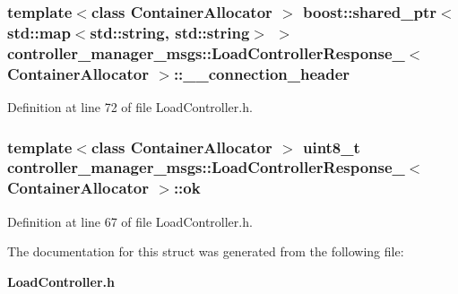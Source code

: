 \subsubsection[{\-\_\-\-\_\-connection\-\_\-header}]{\setlength{\rightskip}{0pt plus 5cm}template$<$class Container\-Allocator $>$ boost\-::shared\-\_\-ptr$<$std\-::map$<$std\-::string, std\-::string$>$ $>$ {\bf controller\-\_\-manager\-\_\-msgs\-::\-Load\-Controller\-Response\-\_\-}$<$ \-Container\-Allocator $>$\-::{\bf \-\_\-\-\_\-connection\-\_\-header}}\label{structcontroller__manager__msgs_1_1LoadControllerResponse___ad07fce554b682ac2e528c9405b0061b2}


\-Definition at line 72 of file \-Load\-Controller.\-h.

\subsubsection[{ok}]{\setlength{\rightskip}{0pt plus 5cm}template$<$class Container\-Allocator $>$ uint8\-\_\-t {\bf controller\-\_\-manager\-\_\-msgs\-::\-Load\-Controller\-Response\-\_\-}$<$ \-Container\-Allocator $>$\-::{\bf ok}}\label{structcontroller__manager__msgs_1_1LoadControllerResponse___a634648f3d9abd68b90b3e108e6fd0520}


\-Definition at line 67 of file \-Load\-Controller.\-h.



\-The documentation for this struct was generated from the following file\-:\begin{DoxyCompactItemize}
\item 
{\bf \-Load\-Controller.\-h}\end{DoxyCompactItemize}
